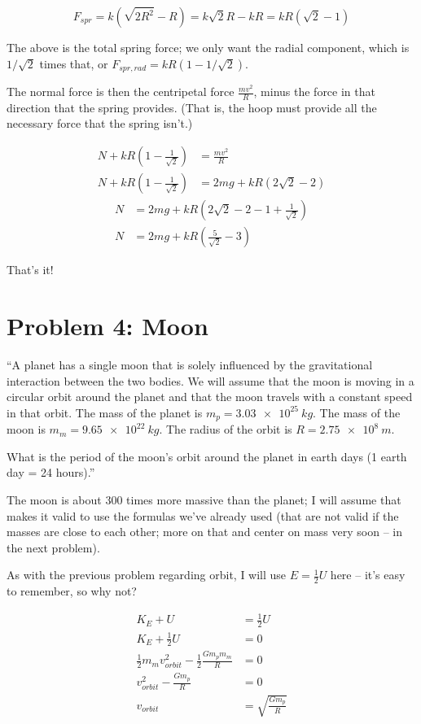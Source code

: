 \documentclass[8.01x]{subfiles}
\begin{document}
\begin{equation}
F_{spr} = k (\sqrt{2 R^2} - R) = k \sqrt{2} R - k R = k R (\sqrt{2} - 1)
\end{equation}

The above is the total spring force; we only want the radial component, which is $1/\sqrt{2}$ times that, or $F_{spr,rad} = k R(1 - 1/\sqrt{2})$.

The normal force is then the centripetal force $\frac{m v^2}{R}$, minus the force in that direction that the spring provides. (That is, the hoop must provide all the necessary force that the spring isn't.)

\begin{align}
N + k R(1 - \frac{1}{\sqrt{2}}) &= \frac{m v^2}{R}\\
N + k R(1 - \frac{1}{\sqrt{2}}) &= 2 m g + k R(2\sqrt{2} - 2)
\end{align}
\begin{align}
N &= 2 m g + k R\left(2\sqrt{2} - 2 - 1 + \frac{1}{\sqrt{2}}\right)\\
N &= 2 m g + k R\left(\frac{5}{\sqrt{2}} - 3\right)
\end{align}

That's it!

\section{Problem 4: Moon}

``A planet has a single moon that is solely influenced by the gravitational interaction between the two bodies. We will assume that the moon is moving in a circular orbit around the planet and that the moon travels with a constant speed in that orbit. The mass of the planet is $m_p = \SI{3.03e25}{kg}$. The mass of the moon is $m_m = \SI{9.65e22}{kg}$. The radius of the orbit is $R = \SI{2.75e8}{m}$.

What is the period of the moon's orbit around the planet in earth days (1 earth day = 24 hours).''

The moon is about 300 times more massive than the planet; I will assume that makes it valid to use the formulas we've already used (that are not valid if the masses are close to each other; more on that and center on mass very soon -- in the next problem).

As with the previous problem regarding orbit, I will use $E = \frac{1}{2} U$ here -- it's easy to remember, so why not?

\begin{align}
K_E + U &= \frac{1}{2} U\\
K_E + \frac{1}{2} U &= 0\\
\frac{1}{2} m_m v_{orbit}^2 - \frac{1}{2} \frac{G m_p m_m}{R} &= 0\\
v_{orbit}^2 - \frac{G m_p}{R} &= 0\\
v_{orbit} &= \sqrt{\frac{G m_p}{R}}
\end{align}
\end{document}
